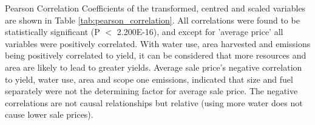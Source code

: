 \documentclass[review,12pt,authoryear]{elsarticle}
\begin{document}
\begin{linenumbers}
Pearson Correlation Coefficients of the transformed, centred and scaled variables are shown in Table \ref{tab:pearson_correlation}. All correlations were found to be statistically significant (P $<$ 2.200E-16), and except for 'average price' all variables were positively correlated. With water use, area harvested and emissions being positively correlated to yield, it can be considered that more resources and area are likely to lead to greater yields. Average sale price's negative correlation to yield, water use, area and scope one emissions, indicated that size and fuel separately were not the determining factor for average sale price. The negative correlations are not causal relationships but relative (using more water does not cause lower sale prices).
\par
\begin{table}[]
  \caption{Pairwise Pearson correlation coefficients for logarithmically transformed values.}\label{tab:pearson_correlation}
\end{table}
\end{linenumbers}
\end{document}
